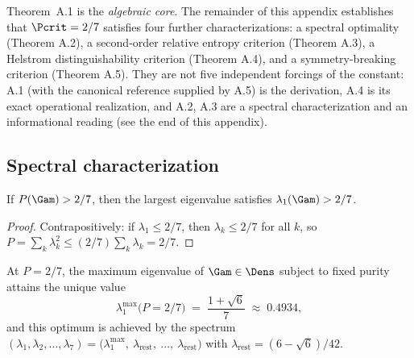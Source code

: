 Theorem~A.1 is the \emph{algebraic core}. The remainder of this appendix
establishes that $\Pcrit = 2/7$ satisfies four further characterizations: a
spectral optimality (Theorem A.2), a second-order relative entropy criterion
(Theorem A.3), a Helstrom distinguishability criterion (Theorem A.4), and a
symmetry-breaking criterion (Theorem A.5). They are not five independent
forcings of the constant: A.1 (with the canonical reference supplied by A.5) is
the derivation, A.4 is its exact operational realization, and A.2, A.3 are a
spectral characterization and an informational reading (see the end of this
appendix).

\subsection{Spectral characterization}
\label{app:pcrit-spectral}

\begin{lemma}\label{lem:spectral-oneside}
If $P(\Gam) > 2/7$, then the largest eigenvalue satisfies $\lambda_1(\Gam) > 2/7$.
\end{lemma}

\begin{proof}
Contrapositively: if $\lambda_1 \leq 2/7$, then $\lambda_k \leq 2/7$ for all $k$, so
$P = \sum_k \lambda_k^2 \leq (2/7)\sum_k \lambda_k = 2/7$.
\end{proof}

\begin{theorembox}
At $P = 2/7$, the maximum eigenvalue of $\Gam \in \Dens$ subject to fixed
purity attains the unique value
\[
  \lambda_1^{\max}\bigl(P = 2/7\bigr) \;=\; \frac{1 + \sqrt{6}}{7} \;\approx\; 0.4934,
\]
and this optimum is achieved by the spectrum
$(\lambda_1, \lambda_2, \ldots, \lambda_7) = \bigl(\lambda_1^{\max},\ \lambda_{\mathrm{rest}},\ \ldots,\ \lambda_{\mathrm{rest}}\bigr)$
with $\lambda_{\mathrm{rest}} = (6 - \sqrt{6})/42$.
\end{theorembox}

